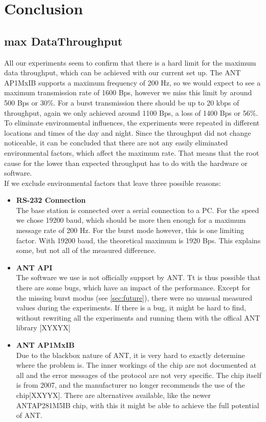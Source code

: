 \chapter{Conclusion}

\section{max DataThroughput}
\label{sec:dataThrougput}

All our experiments seem to confirm that there is a hard limit for the maximum data throughput, which can be achieved with our current set up. The ANT AP1MxIB supports a maximum frequency of 200 Hz, so we would expect to see a maximum transmission rate of 1600 Bps, however we miss this limit by around 500 Bps or 30\%. For a burst transmission there should be up to 20 kbps  of throughput, again we only achieved around 1100 Bps, a loss of 1400 Bps or 56\%.\\
To eliminate environmental influences, the experiments were repeated in different locations and times of the day and night. Since the throughput did not change noticeable, it can be concluded that there are not any easily eliminated environmental factors, which affect the maximum rate. That means that the root cause for the lower than expected throughput has to do with the hardware or software. \\

If we exclude environmental factors that leave three possible reasons:
\begin{itemize}
	\item{\textbf{RS-232 Connection}} \hfill \\ The base station is connected over a serial connection to a PC. For the speed we chose 19200 baud, which should be more then enough for a maximum message rate of 200 Hz. For the burst mode however, this is one limiting factor. With 19200 baud, the theoretical maximum is 1920 Bps. This explains some, but not all of the measured difference.
	
	\item{\textbf{ANT API}} \hfill \\ The software we use is not officially support by ANT. Tt is thus possible that there are some bugs, which have an impact of the performance. Except for the missing burst modus (see \ref{sec:future}), there were no unusual measured values during the experiments. If there is a bug, it might be hard to find, without rewriting all the experiments and running them with the offical ANT library [XYXYX]
	
	\item{\textbf{ANT AP1MxIB}} \hfill \\ Due to the blackbox nature of ANT, it is very hard to exactly determine where the problem is. The inner workings of the chip are not documented at all and the error messages of the protocol are not very specific. The chip itself is from 2007, and the manufacturer no longer recommends the use of the chip[XXYYX]. There are alternatives available, like the newer ANTAP281M5IB chip, with this it might be able to achieve the full potential of ANT.
\end{itemize}
\newpage
